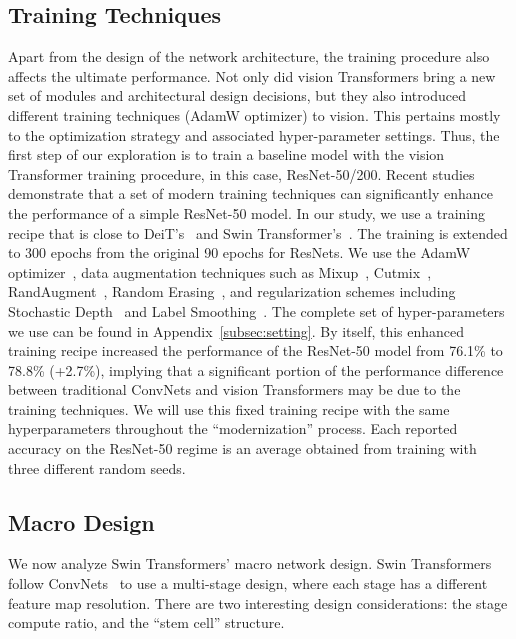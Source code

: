 \documentclass[10pt,twocolumn,letterpaper]{article}
\begin{document}
\subsection{Training Techniques}
Apart from the design of the network architecture, the training procedure also affects the ultimate performance. 
Not only did vision Transformers bring a new set of modules and architectural design decisions, but they also introduced different training techniques (\eg AdamW optimizer) to vision.
This pertains mostly to the optimization strategy and associated hyper-parameter settings.
Thus, the first step of our exploration is to train a baseline model with the vision Transformer training procedure, in this case, ResNet-50/200. 
Recent studies~\cite{bello2021revisiting, Wightman2021resnet} demonstrate that a set of modern training techniques can significantly enhance the performance of a simple ResNet-50 model. In our study, we use a training recipe that is close to DeiT's~\cite{Touvron2020} and Swin Transformer's~\cite{Liu2021swin}. The training is extended to 300 epochs from the original 90 epochs for ResNets. We use the AdamW optimizer~\cite{Loshchilov2019}, data augmentation techniques such as Mixup~\cite{Zhang2018a}, Cutmix~\cite{Yun2019}, RandAugment~\cite{Cubuk2020}, Random Erasing~\cite{Zhong2020}, and regularization schemes including Stochastic Depth~\cite{Huang2017} and Label Smoothing~\cite{Szegedy2016a}. The complete set of hyper-parameters we use can be found in Appendix~\ref{subsec:setting}. By itself, this enhanced training recipe increased the performance of the ResNet-50 model from 76.1\% \cite{torchvision} to 78.8\% (+2.7\%), implying that a significant portion of the performance difference between traditional ConvNets and vision Transformers may be due to the training techniques. We will use this fixed training recipe with the same hyperparameters throughout the ``modernization'' process. Each reported accuracy on the ResNet-50 regime is an average obtained from training with three different random seeds.

\subsection{Macro Design}
We now analyze Swin Transformers' macro network design. Swin Transformers follow ConvNets~\cite{Simonyan2015, He2016} to use a multi-stage design, where each stage has a different feature map resolution. There are two interesting design considerations: the stage compute ratio, and the ``stem cell'' structure.
\end{document}
